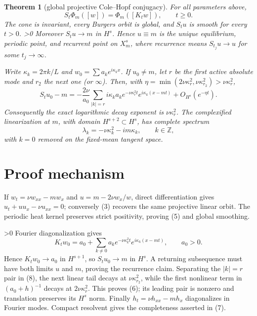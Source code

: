 \documentclass[8pt]{extarticle}
\newtheorem{theorem}{Theorem}
\begin{document}
\begin{theorem}[global projective Cole--Hopf conjugacy]
For all parameters above,
\[
S_t\Phi_m([w])=\Phi_m([K_tw]),\qquad t\ge0.                           \tag{5}
\]
The cone is invariant, every Burgers orbit is global, and \(S_tu\) is smooth for
every \(t>0\).
\ifnum\CRevisionRound>0
 Moreover \(S_tu\to m\) in \(H^s\). Hence \(u\equiv m\) is the unique equilibrium,
periodic point, and recurrent point on \(X_m^s\), where recurrence means
\(S_{t_j}u\to u\) for some \(t_j\to\infty\).

Write \(\kappa_k=2\pi k/L\) and
\(w_0=\sum a_ke^{i\kappa_kx}\). If \(u_0\ne m\), let \(r\) be the first active
absolute mode and \(r_2\) the next one (or \(\infty\)). Then, with
\(\eta=\min(2\nu\kappa_r^2,\nu\kappa_{r_2}^2)>\nu\kappa_r^2\),
\[
S_tu_0-m=-\frac{2\nu}{a_0}\sum_{|k|=r}i\kappa_k a_k
 e^{-\nu\kappa_r^2t}e^{i\kappa_k(x-mt)}
 +O_{H^s}(e^{-\eta t}).                                               \tag{6}
\]
Consequently the exact logarithmic decay exponent is \(\nu\kappa_r^2\).
The complexified linearization at \(m\), with domain \(H^{s+2}\subset H^s\), has
complete spectrum
\[
\lambda_k=-\nu\kappa_k^2-i m\kappa_k,\qquad k\in\mathbb Z,             \tag{7}
\]
with \(k=0\) removed on the fixed-mean tangent space.
\fi
\end{theorem}

\section{Proof mechanism}

If \(w_t=\nu w_{xx}-m w_x\) and \(u=m-2\nu w_x/w\), direct differentiation
gives \(u_t+uu_x-\nu u_{xx}=0\); conversely (3) recovers the same projective
linear orbit. The periodic heat kernel preserves strict positivity, proving (5)
and global smoothing.

\ifnum\CRevisionRound>0
Fourier diagonalization gives
\[
K_tw_0=a_0+\sum_{k\ne0}a_k
e^{-\nu\kappa_k^2t}e^{i\kappa_k(x-mt)},\qquad a_0>0.                   \tag{8}
\]
Hence \(K_tw_0\to a_0\) in \(H^{s+1}\), so \(S_tu_0\to m\) in \(H^s\).
A returning subsequence must have both limits \(u\) and \(m\), proving the recurrence
claim. Separating the \(|k|=r\) pair in (8), the next linear tail decays at
\(\nu\kappa_{r_2}^2\), while the first nonlinear term in
\((a_0+h)^{-1}\) decays at \(2\nu\kappa_r^2\). This proves (6); its leading
pair is nonzero and translation preserves its \(H^s\) norm. Finally
\(h_t=\nu h_{xx}-m h_x\) diagonalizes in Fourier modes. Compact resolvent gives
the completeness asserted in (7).
\fi
\end{document}

